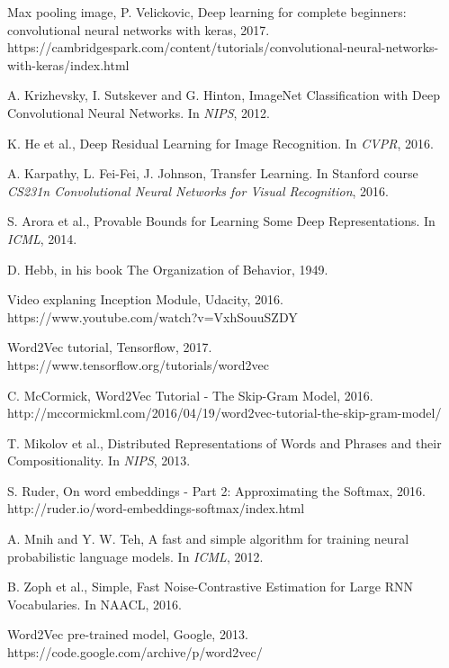 \begin{thebibliography}{999}
Max pooling image, P. Velickovic, 
Deep learning for complete beginners: convolutional neural networks with keras, 2017.\\
https://cambridgespark.com/content/tutorials/convolutional-neural-networks-with-keras/index.html

A. Krizhevsky, I. Sutskever and G. Hinton, ImageNet Classification with Deep Convolutional
Neural Networks. In \textit{NIPS}, 2012.

K. He et al., Deep Residual Learning for Image Recognition. In \textit{CVPR}, 2016.

A. Karpathy, L. Fei-Fei, J. Johnson, Transfer Learning. In Stanford course \textit{CS231n Convolutional Neural Networks for Visual Recognition}, 2016.

S. Arora et al., Provable Bounds for Learning Some Deep Representations. In \textit{ICML}, 2014. 

D. Hebb, in his book The Organization of Behavior, 1949.

Video explaning Inception Module, Udacity, 2016. \\ https://www.youtube.com/watch?v=VxhSouuSZDY

Word2Vec tutorial, Tensorflow, 2017. \\
https://www.tensorflow.org/tutorials/word2vec

C. McCormick, Word2Vec Tutorial - The Skip-Gram Model, 2016. \\http://mccormickml.com/2016/04/19/word2vec-tutorial-the-skip-gram-model/

T. Mikolov et al., Distributed Representations of Words and Phrases and their Compositionality. In \textit{NIPS}, 2013.

S. Ruder, On word embeddings - Part 2: Approximating the Softmax, 2016. \\http://ruder.io/word-embeddings-softmax/index.html

A. Mnih and Y. W. Teh, A fast and simple algorithm for training neural probabilistic language models. In \textit{ICML}, 2012.

B. Zoph et al., Simple, Fast Noise-Contrastive Estimation for Large RNN Vocabularies. In {NAACL}, 2016.

Word2Vec pre-trained model, Google, 2013. \\https://code.google.com/archive/p/word2vec/


\end{thebibliography}
